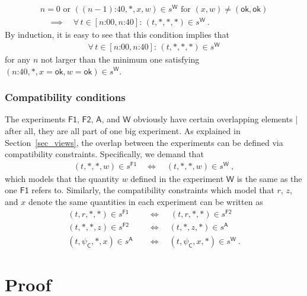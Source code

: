 \documentclass[12pt]{article}
\theoremstyle{plain}
\theoremstyle{definition}
\newcommand*{\Friendone}{\mathsf{F1}}
\newcommand*{\Friendtwo}{\mathsf{F2}}
\newcommand*{\Assistant}{\mathsf{A}}
\newcommand*{\Wigner}{\mathsf{W}}
\newcommand*{\Coin}{\mathsf{C}}
\newcommand*{\ok}{\mathsf{ok}}
\begin{document}
\begin{multline} \label{eq_alwaysrepeat}
    n=0   \text{ or } (\text{$(n-1)$:40}, *, x, w) \in s^{\Wigner} \text{ for $(x, w) \neq (\ok, \ok)$}  \\ \quad \implies \quad \forall \, t \in [\text{$n$:00}, \text{$n$:40}] :\,  (t, *, *, *) \in s^{\Wigner}  \ .
 \end{multline}
 By induction, it is easy to see that this condition implies that
 \begin{align}\label{eq_repetitionimplication}
   \forall \, t \in [\text{$n$:00}, \text{$n$:40}] : \,  (t, *, *, *) \in s^{\Wigner}
 \end{align}
 for any $n$ not larger than the minimum one satisfying $(\text{$n$:40}, *, x = \ok, w = \ok) \in s^{\Wigner}$.


\subsubsection*{Compatibility conditions}

The experiments $\Friendone$, $\Friendtwo$, $\Assistant$, and $\Wigner$ obviously have certain overlapping elements | after all, they are all part of one big experiment. As explained in Section~\ref{sec_views}, the overlap between the experiments can be defined via compatibility constraints. Specifically, we demand that 
\begin{align} \label{eq_compFoneWigner}
   (t, *, *, w) \in s^{\Friendone} \quad \iff \quad (t, *, *, w) \in s^{\Wigner} \ ,
\end{align}
which models that the quantity $w$ defined in the experiment $\Wigner$ is the same as the one $\Friendone$ refers to. Similarly, the compatibility constraints which model that $r$, $z$, and $x$ denote the same quantities in each experiment can be written as 
\begin{align} \label{eq_compFoneFtwo}
   (t, r, *, *) \in s^{\Friendone} \quad & \iff \quad  \, (t, r, *, *) \in s^{\Friendtwo} \\ 
   \label{eq_compFtwoAssistant}  (t, *, *, z) \in s^{\Friendtwo} \quad & \iff \quad (t, *, z, *) \in s^{\Assistant}  \\
 \label{eq_compAssistantWigner} (t, \psi_{\Coin}, *, x) \in s^{\Assistant} \quad & \iff \quad  (t, \psi_{\Coin}, x, *) \in s^{\Wigner}      \ .
\end{align}

\section{Proof} \label{sec_proof}
\end{document}
